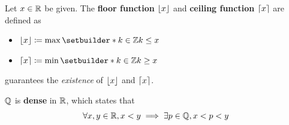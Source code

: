 \bigskip

\begin{definition} \label{an:def:floor-ceiling-functions}
    Let $x \in \mathbb{R}$ be given. The \textbf{floor function} $\lfloor x\rfloor$
    and \textbf{ceiling function} $\lceil x\rceil$ are defined as
    \begin{itemize}
        \item $\floor{x} \coloneqq \max\setbuilder*{k \in \Z}{k \leq x}$
        \item $\ceil{x} \coloneqq \min\setbuilder*{k \in \Z}{k \geq x}$
    \end{itemize}
     guarantees the \emph{existence} of $\lfloor x\rfloor$ and $\lceil x\rceil$.
\end{definition}

\bigskip

\begin{theorem} \label{an:thm:Q-is-dense-in-R}
    $\mathbb{Q}$ is \textbf{dense} in $\mathbb{R}$, which states that
    \[
    \forall x,y \in \mathbb{R}, x < y \implies \exists p \in \mathbb{Q}, x < p < y
    \]
\end{theorem}
